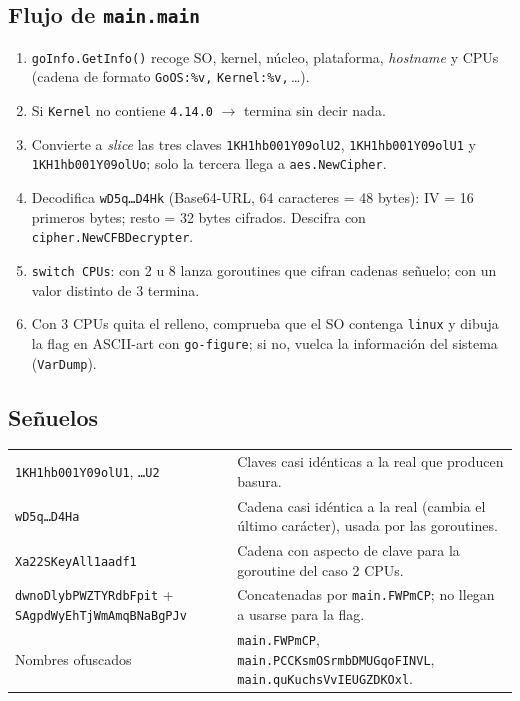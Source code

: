\documentclass[11pt,a4paper]{article}
\begin{document}
\subsection{Flujo de \texttt{main.main}}
\begin{enumerate}
  \item \texttt{goInfo.GetInfo()} recoge SO, kernel, núcleo, plataforma, \emph{hostname} y CPUs
        (cadena de formato \texttt{GoOS:\%v,} \texttt{Kernel:\%v,}\,\dots).
  \item Si \texttt{Kernel} no contiene \texttt{4.14.0} $\to$ termina sin decir nada.
  \item Convierte a \emph{slice} las tres claves \texttt{1KH1hb001Y09olU2}, \texttt{1KH1hb001Y09olU1} y
        \texttt{1KH1hb001Y09olUo}; solo la tercera llega a \texttt{aes.NewCipher}.
  \item Decodifica \texttt{wD5q\dots D4Hk} (Base64-URL, 64 caracteres = 48 bytes): IV = 16 primeros bytes; resto =
        32 bytes cifrados. Descifra con \texttt{cipher.NewCFBDecrypter}.
  \item \texttt{switch CPUs}: con 2 u 8 lanza goroutines que cifran cadenas señuelo; con un valor distinto de 3 termina.
  \item Con 3 CPUs quita el relleno, comprueba que el SO contenga \texttt{linux} y dibuja la flag en ASCII-art con
        \texttt{go-figure}; si no, vuelca la información del sistema (\texttt{VarDump}).
\end{enumerate}

\subsection{Señuelos}
\begin{tabularx}{\linewidth}{@{}lX@{}}
\toprule
\texttt{1KH1hb001Y09olU1}, \texttt{\dots U2} & Claves casi idénticas a la real que producen basura. \\
\texttt{wD5q\dots D4Ha} & Cadena casi idéntica a la real (cambia el último carácter), usada por las goroutines. \\
\texttt{Xa22SKeyAll1aadf1} & Cadena con aspecto de clave para la goroutine del caso 2 CPUs. \\
\texttt{dwnoDlybPWZTYRdbFpit} + \texttt{SAgpdWyEhTjWmAmqBNaBgPJv} & Concatenadas por \texttt{main.FWPmCP}; no llegan a usarse para la flag. \\
Nombres ofuscados & \texttt{main.FWPmCP}, \texttt{main.PCCKsmOSrmbDMUGqoFINVL}, \texttt{main.quKuchsVvIEUGZDKOxl}. \\
\bottomrule
\end{tabularx}
\end{document}
